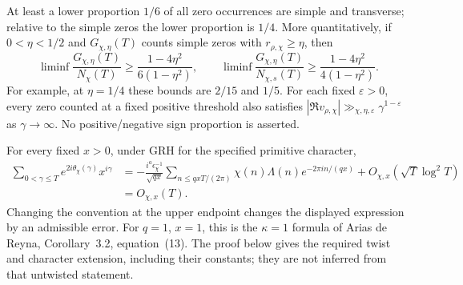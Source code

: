 \begin{theorem}
\[\]
At least a lower proportion $1/6$ of all zero occurrences are simple
and transverse; relative to the simple zeros the lower proportion is
$1/4$. More quantitatively, if $0<\eta<1/2$ and $G_{\chi,\eta}(T)$
counts simple zeros with $r_{\rho,\chi}\ge\eta$, then
\begin{equation}\label{eq:A037-counts}
 \liminf\frac{G_{\chi,\eta}(T)}{N_\chi(T)}
 \ge\frac{1-4\eta^2}{6(1-\eta^2)},\qquad
 \liminf\frac{G_{\chi,\eta}(T)}{N_{\chi,s}(T)}
 \ge\frac{1-4\eta^2}{4(1-\eta^2)}.
\end{equation}
For example, at $\eta=1/4$ these bounds are $2/15$ and $1/5$.
For each fixed $\varepsilon>0$, every zero counted at a fixed positive
threshold also satisfies
$|\Re v_{\rho,\chi}|\gg_{\chi,\eta,\varepsilon}
\gamma^{1-\varepsilon}$ as $\gamma\to\infty$.
No positive/negative sign proportion is asserted.
\end{theorem}

\begin{lemma}\label{lem:A037-twist}
For every fixed $x>0$, under GRH for the specified primitive character,
\begin{align}\label{eq:A037-twist}
 \sum_{0<\gamma\le T}e^{2i\theta_\chi(\gamma)}x^{i\gamma}
 &=-\frac{i^a\epsilon_\chi^{-1}}{\sqrt{qx}}
    \sum_{n\le qxT/(2\pi)}\chi(n)\Lambda(n)e^{-2\pi i n/(qx)}
    +O_{\chi,x}(\sqrt T\log^2 T)\\
 &=O_{\chi,x}(T).\nonumber
\end{align}
Changing the convention at the upper endpoint changes the displayed
expression by an admissible error. For $q=1$, $x=1$, this is the
$\kappa=1$ formula of Arias de Reyna, Corollary~3.2, equation~(13).
The proof below gives the required twist and character extension,
including their constants; they are not inferred from that untwisted
statement.
\end{lemma}

